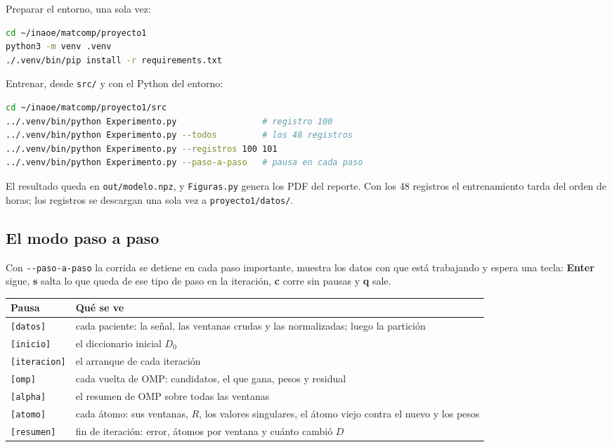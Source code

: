 \documentclass[11pt,letterpaper]{article}
\begin{document}
Preparar el entorno, una sola vez:

\begin{lstlisting}[style=codigo, language=bash]
cd ~/inaoe/matcomp/proyecto1
python3 -m venv .venv
./.venv/bin/pip install -r requirements.txt
\end{lstlisting}

Entrenar, desde \texttt{src/} y con el Python del entorno:

\begin{lstlisting}[style=codigo, language=bash]
cd ~/inaoe/matcomp/proyecto1/src
../.venv/bin/python Experimento.py                 # registro 100
../.venv/bin/python Experimento.py --todos         # los 48 registros
../.venv/bin/python Experimento.py --registros 100 101
../.venv/bin/python Experimento.py --paso-a-paso   # pausa en cada paso
\end{lstlisting}

El resultado queda en \texttt{out/modelo.npz}, y
\texttt{Figuras.py} genera los PDF del reporte. Con los 48 registros el
entrenamiento tarda del orden de horas; los registros se descargan una
sola vez a \texttt{proyecto1/datos/}.

\subsection*{El modo paso a paso}

Con \texttt{-{}-paso-a-paso} la corrida se detiene en cada paso
importante, muestra los datos con que está trabajando y espera una
tecla: \textbf{Enter} sigue, \textbf{s} salta lo que queda de ese tipo
de paso en la iteración, \textbf{c} corre sin pausas y \textbf{q} sale.

\begin{center}
\begin{tabular}{lp{10cm}}
    \toprule
    \textbf{Pausa} & \textbf{Qué se ve} \\
    \midrule
    \texttt{[datos]}     & cada paciente: la señal, las ventanas crudas
                           y las normalizadas; luego la partición \\
    \texttt{[inicio]}    & el diccionario inicial $D_0$ \\
    \texttt{[iteracion]} & el arranque de cada iteración \\
    \texttt{[omp]}       & cada vuelta de OMP: candidatos, el que gana,
                           pesos y residual \\
    \texttt{[alpha]}     & el resumen de OMP sobre todas las ventanas \\
    \texttt{[atomo]}     & cada átomo: sus ventanas, $R$, los valores
                           singulares, el átomo viejo contra el nuevo y
                           los pesos \\
    \texttt{[resumen]}   & fin de iteración: error, átomos por ventana y
                           cuánto cambió $D$ \\
    \bottomrule
\end{tabular}
\end{center}
\end{document}
